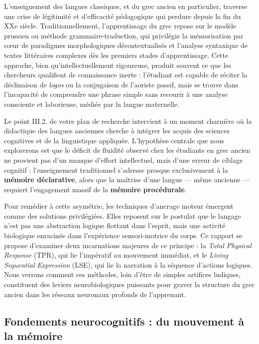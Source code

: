 L'enseignement des langues classiques, et du grec ancien en particulier, traverse une crise de
légitimité et d'efficacité pédagogique qui perdure depuis la fin du XXe siècle. Traditionnellement,
l'apprentissage du grec repose sur le \og modèle prussien\fg{} ou méthode grammaire-traduction, qui
privilégie la mémorisation par cœur de paradigmes morphologiques décontextualisés et l'analyse
syntaxique de textes littéraires complexes dès les premiers stades
d'apprentissage.\cite{III-2-2-ref1} Cette approche, bien qu'intellectuellement rigoureuse, produit
souvent ce que les chercheurs qualifient de \og connaissance inerte\fg{} : l'étudiant est capable de
réciter la déclinaison de \textit{logos} ou la conjugaison de l'aoriste passif, mais se trouve dans
l'incapacité de comprendre une phrase simple sans recourir à une analyse consciente et laborieuse,
médiée par la langue maternelle.

Le point III.2.\cite{III-2-2-ref2} de votre plan de recherche intervient à un moment charnière où la
didactique des langues anciennes cherche à intégrer les acquis des sciences cognitives et de la
linguistique appliquée. L'hypothèse centrale que nous explorerons est que le déficit de fluidité
observé chez les étudiants en grec ancien ne provient pas d'un manque d'effort intellectuel, mais
d'une erreur de ciblage cognitif : l'enseignement traditionnel s'adresse presque exclusivement à la
\textbf{mémoire déclarative}, alors que la maîtrise d'une langue — même ancienne — requiert
l'engagement massif de la \textbf{mémoire procédurale}.\cite{III-2-2-ref3}

Pour remédier à cette asymétrie, les techniques d'ancrage moteur émergent comme des solutions
privilégiées. Elles reposent sur le postulat que le langage n'est pas une abstraction logique
flottant dans l'esprit, mais une activité biologique enracinée dans l'expérience sensori-motrice du
corps. Ce rapport se propose d'examiner deux incarnations majeures de ce principe : la \textit{Total
Physical Response} (TPR), qui lie l'impératif au mouvement immédiat, et le \textit{Living Sequential
Expression} (LSE), qui lie la narration à la séquence d'actions logiques. Nous verrons comment ces
méthodes, loin d'être de simples artifices ludiques, constituent des leviers neurobiologiques
puissants pour graver la structure du grec ancien dans les réseaux neuronaux profonds de
l'apprenant.



\subsection{Fondements neurocognitifs : du mouvement à la mémoire}

